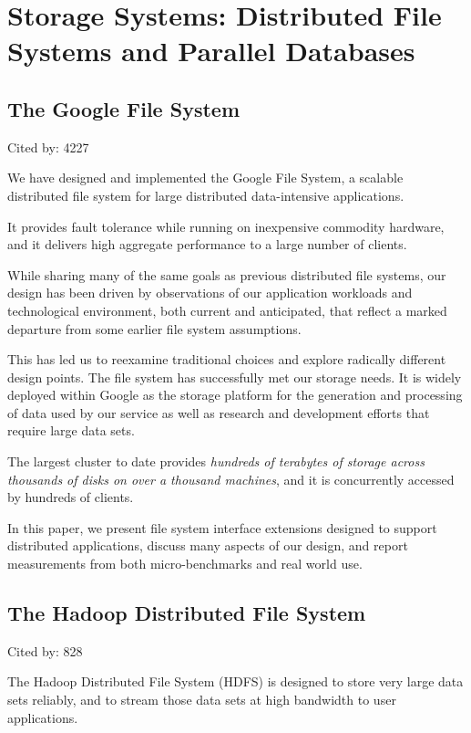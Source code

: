 \documentclass[a4paper,11pt]{article}
\begin{document}
\section{Storage Systems: Distributed File Systems and Parallel Databases}

\subsection*{The Google File System}
{{\color{cyan} {\color{magenta} Cited by: 4227}

We have designed and implemented the 
{\color{black} Google File System\cite{gfs}},
a scalable distributed file system for large distributed data-intensive applications. 

It provides fault tolerance while running on inexpensive commodity hardware, and 
it delivers high aggregate performance to a large number of clients.

While sharing many of the same goals as previous distributed file systems, 
our design has been driven by observations of our application workloads and technological environment,
both current and anticipated, that reflect a marked departure from some earlier file system assumptions. 

This has led us to reexamine traditional choices and explore radically different design points.
The file system has successfully met our storage needs.
It is widely deployed within Google as the storage platform for the generation and processing of data used by our service
as well as research and development efforts that require large data sets. 

The largest cluster to date provides 
{\color{red} \em hundreds of terabytes of storage across thousands of disks on over a thousand machines}, and 
it is concurrently accessed by hundreds of clients.

In this paper, we 
present file system interface extensions designed to support distributed applications, 
discuss many aspects of our design, and 
report measurements from both micro-benchmarks and real world use.

}

\subsection*{The Hadoop Distributed File System}
{{\color{cyan} {\color{magenta} Cited by: 828}

The 
{\color{black} Hadoop Distributed File System (HDFS)\cite{hdfs}} 
is designed 
to store very large data sets reliably, and 
to stream those data sets at high bandwidth to user applications. 

}}}
\end{document}
